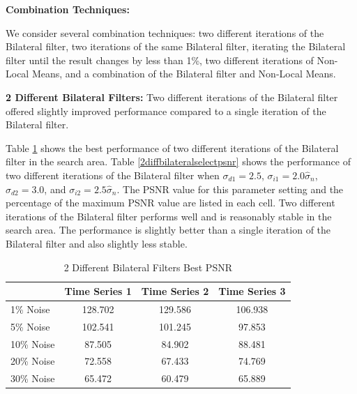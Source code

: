 \documentclass[11pt]{article}
\newcommand{\vs}{\vspace{0.1in}}
\theoremstyle{definition}
\begin{document}
\vs
\noindent
\textbf{Combination Techniques:}

We consider several combination techniques: two different iterations of the Bilateral filter, two iterations of the same Bilateral filter, iterating the Bilateral filter until the result changes by less than 1\%, two different iterations of Non-Local Means, and a combination of the Bilateral filter and Non-Local Means.

\vs
\textbf{2 Different Bilateral Filters:} Two different iterations of the Bilateral filter offered slightly improved performance compared to a single iteration of the Bilateral filter.

Table \ref{2diffbilateralbestpsnr} shows the best performance of two different iterations of the Bilateral filter in the search area. Table \ref{2diffbilateralselectpsnr} shows the performance of two different iterations of the Bilateral filter when $\sigma_{d1} = 2.5$, $\sigma_{i1} = 2.0 \hat{\sigma}_n$, $\sigma_{d2} = 3.0$, and $\sigma_{i2} = 2.5 \hat{\sigma}_n$. The PSNR value for this parameter setting and the percentage of the maximum PSNR value are listed in each cell. Two different iterations of the Bilateral filter performs well and is reasonably stable in the search area. The performance is slightly better than a single iteration of the Bilateral filter and also slightly less stable.

\begin{table}[!h]
\small
\begin{center}
\begin{tabular}{l | c | c | c}
 & Time Series 1 & Time Series 2 & Time Series 3 \\ \hline
1\% Noise & 128.702 & 129.586 & 106.938 \\ \hline
5\% Noise & 102.541 & 101.245 & 97.853 \\ \hline
10\% Noise & 87.505 & 84.902 & 88.481 \\ \hline
20\% Noise & 72.558 & 67.433 & 74.769 \\ \hline
30\% Noise & 65.472 & 60.479 & 65.889
\end{tabular}
\caption{2 Different Bilateral Filters Best PSNR}
\label{2diffbilateralbestpsnr}
\end{center}
\end{table}
\end{document}
